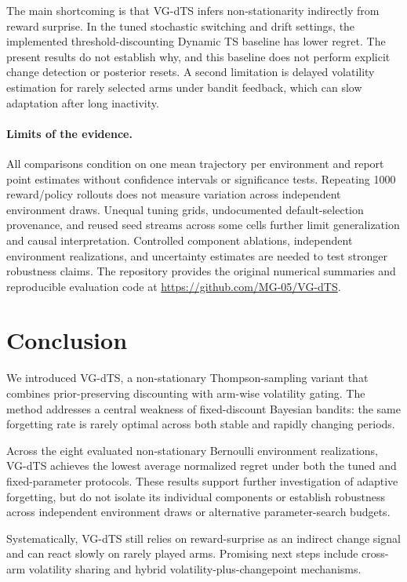 \documentclass{article}
\begin{document}
The main shortcoming is that VG-dTS infers non-stationarity indirectly from reward surprise.
In the tuned stochastic switching and drift settings, the implemented threshold-discounting Dynamic TS baseline has lower regret. The present results do not establish why, and this baseline does not perform explicit change detection or posterior resets.
A second limitation is delayed volatility estimation for rarely selected arms under bandit feedback, which can slow adaptation after long inactivity.
\paragraph{Limits of the evidence.}
All comparisons condition on one mean trajectory per environment and report point estimates without confidence intervals or significance tests. Repeating 1000 reward/policy rollouts does not measure variation across independent environment draws. Unequal tuning grids, undocumented default-selection provenance, and reused seed streams across some cells further limit generalization and causal interpretation. Controlled component ablations, independent environment realizations, and uncertainty estimates are needed to test stronger robustness claims. The repository provides the original numerical summaries and reproducible evaluation code at \url{https://github.com/MG-05/VG-dTS}.

\section{Conclusion}
We introduced VG-dTS, a non-stationary Thompson-sampling variant that combines prior-preserving discounting with arm-wise volatility gating. The method addresses a central weakness of fixed-discount Bayesian bandits: the same forgetting rate is rarely optimal across both stable and rapidly changing periods.

Across the eight evaluated non-stationary Bernoulli environment realizations, VG-dTS achieves the lowest average normalized regret under both the tuned and fixed-parameter protocols. These results support further investigation of adaptive forgetting, but do not isolate its individual components or establish robustness across independent environment draws or alternative parameter-search budgets.

Systematically, VG-dTS still relies on reward-surprise as an indirect change signal and can react slowly on rarely played arms. Promising next steps include cross-arm volatility sharing and hybrid volatility-plus-changepoint mechanisms.



\appendix

\end{document}
